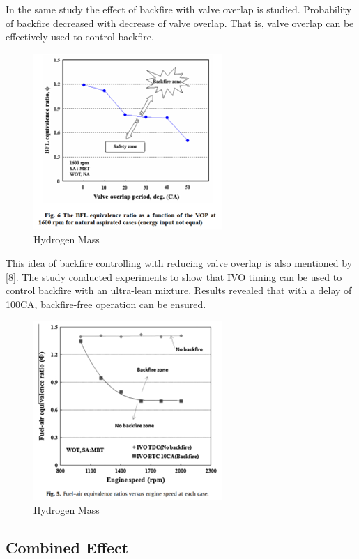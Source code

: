 \documentclass[conference]{IEEEtran}
\begin{document}
In the same study the effect of backfire with valve overlap is studied. Probability of backfire decreased with decrease of valve overlap. That is, valve overlap can be effectively used to control backfire.

\begin{figure}[htbp]
    \centerline{\includegraphics{figures/LR_VT_4.png}}
    \caption{Hydrogen Mass}
    \label{lr_vt_4}
    \end{figure}

This idea of backfire controlling with reducing valve overlap is also mentioned by [8]. The study conducted experiments to show that IVO timing can be used to control backfire with an ultra-lean mixture. Results revealed that with a delay of 100CA, backfire-free operation can be ensured.

\begin{figure}[htbp]
    \centerline{\includegraphics{figures/LR_VT_5.png}}
    \caption{Hydrogen Mass}
    \label{lr_vt_5}
    \end{figure}

\subsection{Combined Effect}
\end{document}
